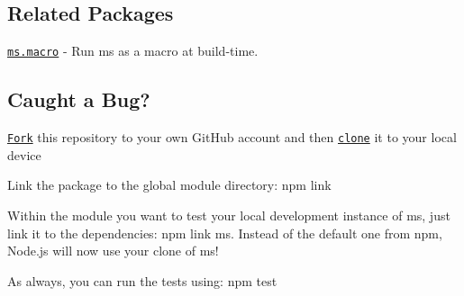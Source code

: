 \subsection*{Related Packages}


\begin{DoxyItemize}
\item \href{https://github.com/knpwrs/ms.macro}{\tt ms.\+macro} -\/ Run {\ttfamily ms} as a macro at build-\/time.
\end{DoxyItemize}

\subsection*{Caught a Bug?}


\begin{DoxyEnumerate}
\item \href{https://help.github.com/articles/fork-a-repo/}{\tt Fork} this repository to your own Git\+Hub account and then \href{https://help.github.com/articles/cloning-a-repository/}{\tt clone} it to your local device
\item Link the package to the global module directory\+: {\ttfamily npm link}
\item Within the module you want to test your local development instance of ms, just link it to the dependencies\+: {\ttfamily npm link ms}. Instead of the default one from npm, Node.\+js will now use your clone of ms!
\end{DoxyEnumerate}

As always, you can run the tests using\+: {\ttfamily npm test} 